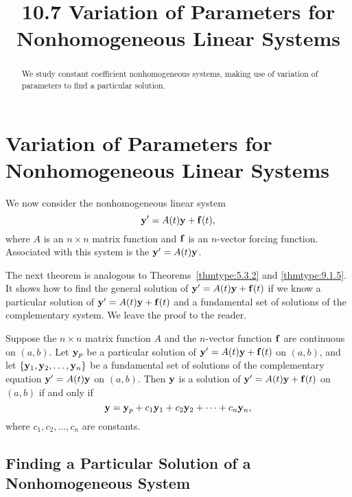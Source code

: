 \documentclass{ximera}
\title{10.7 Variation of Parameters for Nonhomogeneous Linear Systems}%
\begin{document}
\begin{abstract}
We study constant coefficient nonhomogeneous systems, making use of variation of parameters to find a particular solution.
\end{abstract}

\maketitle

\section*{Variation of Parameters for Nonhomogeneous Linear Systems}

We now consider the nonhomogeneous linear system
$$
{\bf y}'= A(t){\bf y}+{\bf f}(t),
$$
where $A$ is an $n\times n$ matrix function and ${\bf f}$ is an
$n$-vector forcing function. Associated with this system is the  ${\bf y}'=A(t){\bf y}$.

The next theorem is analogous to
Theorems~\ref{thmtype:5.3.2} and
\ref{thmtype:9.1.5}. It shows how to find the general solution
of
${\bf y}'=A(t){\bf y}+{\bf f}(t)$ if we know a particular solution of ${\bf
y}'=A(t){\bf y}+{\bf f}(t)$ and a fundamental set of solutions of the
complementary system. We leave the proof to the reader.

\begin{theorem}\label{thmtype:10.7.1}
Suppose the $n\times n$ matrix function $A$ and the $n$-vector
function ${\bf f}$ are continuous on $(a,b)$. Let ${\bf y}_p$ be a
particular solution of ${\bf y}'=A(t){\bf y}+{\bf f}(t)$ on $(a,b)$,
and let
$\{{\bf y}_1,{\bf y}_2,\dots,{\bf y}_n\}$ be a fundamental set of
solutions of the complementary equation ${\bf y}'=A(t){\bf y}$ on
$(a,b)$. Then ${\bf y}$ is a solution of ${\bf y}'=A(t){\bf y}+{\bf
f}(t)$ on $(a,b)$ if and only if
$$
{\bf y}={\bf y}_p+c_1{\bf y}_1+c_2{\bf y}_2+\cdots+c_n{\bf y}_n,
$$
where $c_1, c_2, \dots, c_n$  are constants.
\end{theorem}

\subsection*{Finding a Particular Solution of a Nonhomogeneous System}
\end{document}
